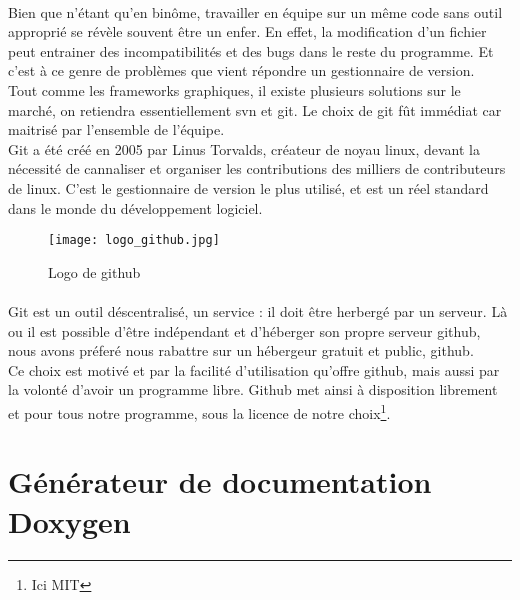         \paragraph{}
            Bien que n'étant qu'en binôme, travailler en équipe sur un même code sans outil approprié se révèle souvent être un enfer. En effet, la modification d'un fichier peut entrainer des incompatibilités et des bugs dans le reste du programme. Et c'est à ce genre de problèmes que vient répondre un gestionnaire de version.
            \\ Tout comme les frameworks graphiques, il existe plusieurs solutions sur le marché, on retiendra essentiellement svn et git. Le choix de git fût immédiat car maitrisé par l'ensemble de l'équipe. 
            \\ Git a été créé en 2005 par Linus Torvalds, créateur de noyau linux, devant la nécessité de cannaliser et organiser les contributions des milliers de contributeurs de linux. C'est le gestionnaire de version le plus utilisé, et est un réel standard dans le monde du développement logiciel.

        \begin{figure}[h]
            \begin{center}
                \texttt{[image: logo\_github.jpg]}
            \end{center}

            \caption{Logo de github}
            \label{github}
        \end{figure}

        \paragraph{}
            Git est un outil déscentralisé, un service : il doit être herbergé par un serveur. Là ou il est possible d'être indépendant et d'héberger son propre serveur github, nous avons préferé nous rabattre sur un hébergeur gratuit et public, github.
            \\ Ce choix est motivé et par la facilité d'utilisation qu'offre github, mais aussi par la volonté d'avoir un programme libre. Github met ainsi à 
            disposition librement et pour tous notre programme, sous la licence de notre choix\footnote{Ici MIT}.
            


    \newpage

    \section{Générateur de documentation Doxygen}
        \lipsum